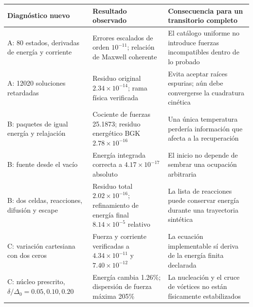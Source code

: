 \documentclass[
  spanish,
  10pt,
  a4paper,
]{article}
\newcounter{none} %
\begin{document}
{\def\LTcaptype{none} %
\begin{longtable}[]{@{}
  >{\raggedright\arraybackslash}p{}
  >{\raggedright\arraybackslash}p{}
  >{\raggedright\arraybackslash}p{}@{}}
\toprule\noalign{}
\begin{minipage}[b]{\linewidth}\raggedright
Diagnóstico nuevo
\end{minipage} & \begin{minipage}[b]{\linewidth}\raggedright
Resultado observado
\end{minipage} & \begin{minipage}[b]{\linewidth}\raggedright
Consecuencia para un transitorio completo
\end{minipage} \\
\midrule\noalign{}
\endhead
\bottomrule\noalign{}
\endlastfoot
A: 80 estados, derivadas de energía y corriente & Errores escalados de
orden \(10^{-11}\); relación de Maxwell coherente & El catálogo uniforme
no introduce fuerzas incompatibles dentro de lo probado \\
A: 12020 soluciones retardadas & Residuo original
\(2.34\times10^{-14}\); rama física verificada & Evita aceptar raíces
espurias; aún debe convergerse la cuadratura cinética \\
B: paquetes de igual energía y relajación & Cociente de fuerzas 25.1873;
residuo energético BGK \(2.78\times10^{-16}\) & Una única temperatura
perdería información que afecta a la recuperación \\
B: fuente desde el vacío & Energía integrada correcta a
\(4.17\times10^{-17}\) absoluto & El inicio no depende de sembrar una
ocupación arbitraria \\
B: dos celdas, reacciones, difusión y escape & Residuo total
\(2.02\times10^{-16}\); refinamiento de energía final
\(8.14\times10^{-5}\) relativo & La lista de reacciones puede conservar
energía durante una trayectoria sintética \\
C: variación cartesiana con dos ceros & Fuerza y corriente verificadas a
\(4.34\times10^{-11}\) y \(7.40\times10^{-12}\) & La ecuación
implementable sí deriva de la energía finita declarada \\
C: núcleo prescrito, \(\delta/\Delta_0=0.05,0.10,0.20\) & Energía cambia
1.26\%; dispersión de fuerza máxima 205\% & La nucleación y el cruce de
vórtices no están físicamente estabilizados \\

\end{longtable}}
\end{document}
